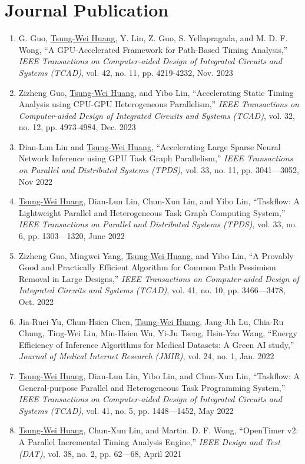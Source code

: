 \documentclass[A4,11pt]{article}
\begin{document}
\section{Journal Publication}
 \begin{enumerate}
 \itemsep-3pt
  \item G. Guo, \underline{Tsung-Wei Huang}, Y. Lin, Z. Guo, S. Yellapragada, and M. D. F. Wong, ``A GPU-Accelerated Framework for Path-Based Timing Analysis,'' \textit{IEEE Transactions on Computer-aided Design of Integrated Circuits and Systems (TCAD)}, vol. 42, no. 11, pp. 4219-4232, Nov. 2023
  \item Zizheng Guo, \underline{Tsung-Wei Huang}, and Yibo Lin, ``Accelerating Static Timing Analysis using CPU-GPU Heterogeneous Parallelism,'' \textit{IEEE Transactions on Computer-aided Design of Integrated Circuits and Systems (TCAD)}, vol. 32, no. 12, pp. 4973-4984, Dec. 2023
  \item Dian-Lun Lin and \underline{Tsung-Wei Huang}, ``Accelerating Large Sparse Neural Network Inference using GPU Task Graph Parallelism,'' \textit{IEEE Transactions on Parallel and Distributed Systems (TPDS)}, vol. 33, no. 11, pp. 3041—3052, Nov 2022
  \item \underline{Tsung-Wei Huang}, Dian-Lun Lin, Chun-Xun Lin, and Yibo Lin, ``Taskflow: A Lightweight Parallel and Heterogeneous Task Graph Computing System,'' \textit{IEEE Transactions on Parallel and Distributed Systems (TPDS)}, vol. 33, no. 6, pp. 1303—1320, June 2022
  \item Zizheng Guo, Mingwei Yang, \underline{Tsung-Wei Huang}, and Yibo Lin, ``A Provably Good and Practically Efficient Algorithm for Common Path Pessimism Removal in Large Designs,'' \textit{IEEE Transactions on Computer-aided Design of Integrated Circuits and Systems (TCAD)}, vol. 41, no. 10, pp. 3466—3478, Oct. 2022
  \item Jia-Ruei Yu, Chun-Hsien Chen, \underline{Tsung-Wei Huang}, Jang-Jih Lu, Chia-Ru Chung, Ting-Wei Lin, Min-Hsien Wu, Yi-Ju Tseng, Hsin-Yao Wang, ``Energy Efficiency of Inference Algorithms for Medical Datasets: A Green AI study,'' \textit{Journal of Medical Internet Research (JMIR)}, vol. 24, no. 1, Jan. 2022
  \item \underline{Tsung-Wei Huang}, Dian-Lun Lin, Yibo Lin, and Chun-Xun Lin, ``Taskflow: A General-purpose Parallel and Heterogeneous Task Programming System,'' \textit{IEEE Transactions on Computer-aided Design of Integrated Circuits and Systems (TCAD)}, vol. 41, no. 5, pp. 1448—1452, May 2022
  \item \underline{Tsung-Wei Huang}, Chun-Xun Lin, and Martin. D. F. Wong, ``OpenTimer v2: A Parallel Incremental Timing Analysis Engine,'' \textit{IEEE Design and Test (DAT)}, vol. 38, no. 2, pp. 62—68, April 2021

\end{enumerate}
\end{document}
